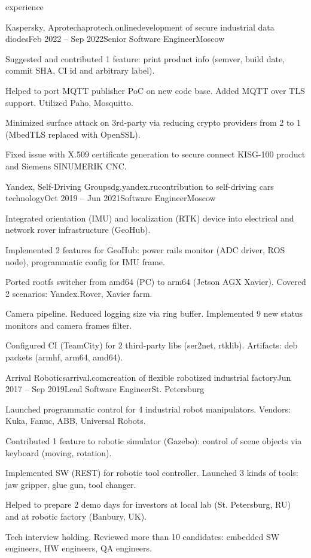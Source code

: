 \documentclass{Vladimir.Ivanov.CV}
\begin{document}
\begin{rSection}{experience}
\begin{rCompany}{Kaspersky, Aprotech}{aprotech.online}{development of secure industrial data diodes}{Feb 2022 -- Sep 2022}{Senior Software Engineer}{Moscow}

\item Suggested and contributed 1 feature: print product info (semver, build date, commit SHA, CI id and arbitrary label).
\item Helped to port MQTT publisher PoC on new code base. Added MQTT over TLS support. Utilized Paho, Mosquitto.
\item Minimized surface attack on 3rd-party via reducing crypto providers from 2 to 1 (MbedTLS replaced with OpenSSL).
\item Fixed issue with X.509 certificate generation to secure connect KISG-100 product and Siemens SINUMERIK CNC.

\end{rCompany}
\begin{rCompany}{Yandex, Self-Driving Group}{sdg.yandex.ru}{contribution to self-driving cars technology}{Oct 2019 -- Jun 2021}{Software Engineer}{Moscow}

\item Integrated orientation (IMU) and localization (RTK) device into electrical and network rover infrastructure (GeoHub).
\item Implemented 2 features for GeoHub: power rails monitor (ADC driver, ROS node), programmatic config for IMU frame.
\item Ported rootfs switcher from amd64 (PC) to arm64 (Jetson AGX Xavier). Covered 2 scenarios: Yandex.Rover, Xavier farm.
\item Camera pipeline. Reduced logging size via ring buffer. Implemented 9 new status monitors and camera frames filter.
\item Configured CI (TeamCity) for 2 third-party libs (ser2net, rtklib). Artifacts: deb packets (armhf, arm64, amd64).

\end{rCompany}
\begin{rCompany}{Arrival Robotics}{arrival.com}{creation of flexible robotized industrial factory}{Jun 2017 -- Sep 2019}{Lead Software Engineer}{St. Petersburg}

\item Launched programmatic control for 4 industrial robot manipulators. Vendors: Kuka, Fanuc, ABB, Universal Robots.
\item Contributed 1 feature to robotic simulator (Gazebo): control of scene objects via keyboard (moving, rotation).
\item Implemented SW (REST) for robotic tool controller. Launched 3 kinds of tools: jaw gripper, glue gun, tool changer.
\item Helped to prepare 2 demo days for investors at local lab (St. Petersburg, RU) and at robotic factory (Banbury, UK).
\item Tech interview holding. Reviewed more than 10 candidates: embedded SW engineers, HW engineers, QA engineers.


\end{rCompany}
\end{rSection}
\end{document}
